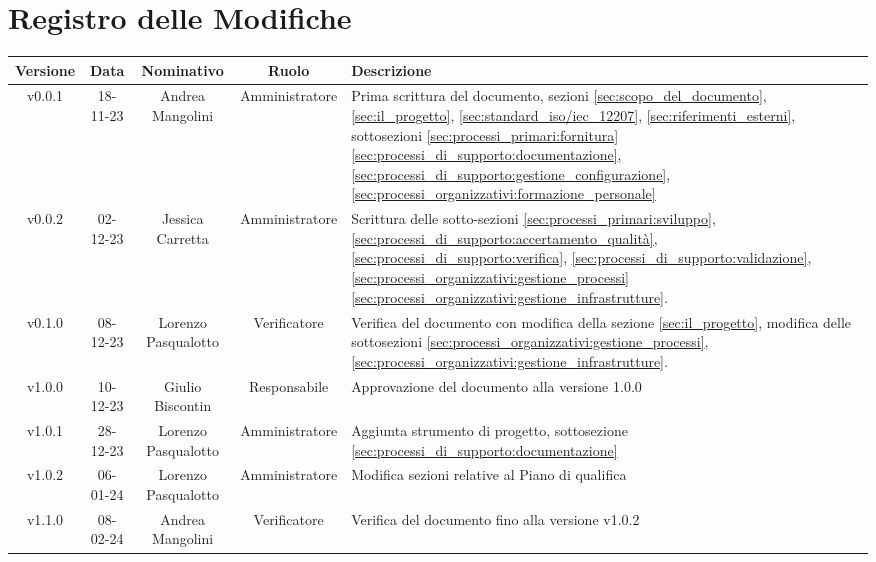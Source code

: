 \section*{\Large Registro delle Modifiche}
    \begin{table}[h]
        \centering
        \renewcommand\tabularxcolumn[1]{m{#1}} %
        \renewcommand{\arraystretch}{1.5}
        \begin{tabularx}{0.98\textwidth}
            {c|c|c|c|>{\centering\arraybackslash}X}
            \rowcolor{black}
            \textbf{\color{white} Versione} & \textbf{\color{white} Data} & \textbf{\color{white} Nominativo} & \textbf{\color{white} Ruolo} & \textbf{\color{white} Descrizione} \\ 
            \hline

            v0.0.1 & 18-11-23 & Andrea Mangolini & Amministratore & Prima scrittura del documento, sezioni \ref{sec:scopo_del_documento}, \ref{sec:il_progetto}, \ref{sec:standard_iso/iec_12207}, \ref{sec:riferimenti_esterni}, sottosezioni \ref{sec:processi_primari:fornitura} \ref{sec:processi_di_supporto:documentazione}, \ref{sec:processi_di_supporto:gestione_configurazione}, \ref{sec:processi_organizzativi:formazione_personale} \\

            v0.0.2 & 02-12-23 & Jessica Carretta & Amministratore & Scrittura delle sotto-sezioni \ref{sec:processi_primari:sviluppo}, \ref{sec:processi_di_supporto:accertamento_qualità}, \ref{sec:processi_di_supporto:verifica}, \ref{sec:processi_di_supporto:validazione}, \ref{sec:processi_organizzativi:gestione_processi}\ref{sec:processi_organizzativi:gestione_infrastrutture}. \\

            v0.1.0 & 08-12-23 & Lorenzo Pasqualotto & Verificatore & 
            Verifica del documento con modifica della sezione \ref{sec:il_progetto}, modifica delle sottosezioni
            \ref{sec:processi_organizzativi:gestione_processi},
            \ref{sec:processi_organizzativi:gestione_infrastrutture}.\\

            v1.0.0 & 10-12-23 & Giulio Biscontin & Responsabile & 
            Approvazione del documento alla versione 1.0.0 \\

            v1.0.1 & 28-12-23 & Lorenzo Pasqualotto & Amministratore & Aggiunta strumento di progetto, sottosezione \ref{sec:processi_di_supporto:documentazione}\\

            v1.0.2 & 06-01-24 & Lorenzo Pasqualotto & Amministratore & Modifica sezioni relative al Piano di qualifica \\

            v1.1.0 & 08-02-24 & Andrea Mangolini & Verificatore & Verifica del documento fino alla versione v1.0.2 \\

            \hline
        \end{tabularx}
    \end{table}